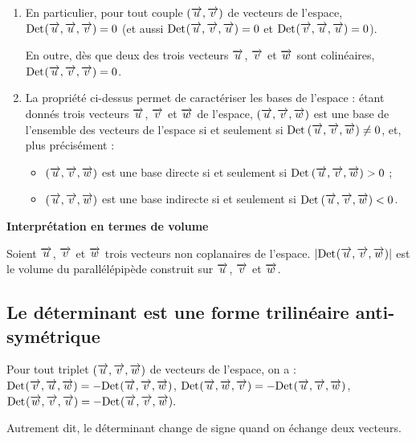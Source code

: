 \documentclass[10pt,oneside]{article}
\newcommand{\Det}{\mathrm{Det}\hspace{.2mm}}
\begin{document}
\begin{rem}

\begin{enumerate}
\item En particulier, pour tout couple $(\overrightarrow{u}, \overrightarrow{v})$ de vecteurs de l'espace, $\Det(\vect{u}, \vect{u}, \vect{v})=0$ (et aussi $\Det(\vect{u}, \vect{v}, \vect{u})=0$ et $\Det(\vect{v}, \vect{u}, \vect{u})=0$).

En outre, dès que deux des trois vecteurs $\overrightarrow{u}$, $\overrightarrow{v}$ et $\overrightarrow{w}$ sont colinéaires, $\Det(\vect{u},\vect{v}, \vect{v})=0$.
\item La propriété ci-dessus permet de caractériser les bases de l'espace : étant donnés trois vecteurs $\overrightarrow{u}$, $\overrightarrow{v}$ et $\overrightarrow{w}$ de l'espace, $(\overrightarrow{u}, \overrightarrow{v}, \overrightarrow{w})$ est une base de l'ensemble des vecteurs de l'espace si et seulement si $\Det\left(\vect{u}, \vect{v}, \vect{w}\right) \neq 0$, et, plus précisément :
	\begin{itemize}\renewcommand{\labelitemi}{$\bullet$}
	\item $(\overrightarrow{u}, \overrightarrow{v}, \overrightarrow{w})$ est une base directe si et seulement si $\Det\left(\vect{u}, \vect{v}, \vect{w}\right)>0$ ;
	\item $(\overrightarrow{u}, \overrightarrow{v}, \overrightarrow{w})$ est une base indirecte si et seulement si $\Det\left(\vect{u}, \vect{v}, \vect{w}\right)<0$.\\
	\end{itemize}
\end{enumerate}
\end{rem}

\begin{rem}
\textbf{Interprétation en termes de volume}

Soient $\overrightarrow{u}$, $\overrightarrow{v}$ et $\overrightarrow{w}$ trois vecteurs non coplanaires de l'espace.
$|\Det(\vect{u}, \vect{v}, \vect{w})|$ est le volume du parallélépipède construit sur $\overrightarrow{u}$, $\overrightarrow{v}$ et $\overrightarrow{w}$.\\

\end{rem}

\subsection{Le déterminant est une forme trilinéaire anti-symétrique}

\begin{propo}

Pour tout triplet $(\overrightarrow{u}, \overrightarrow{v}, \overrightarrow{w})$ de vecteurs de l'espace, on a :
$\Det(\vect{v},\vect{u}, \vect{w})=-\Det(\vect{u},\vect{v}, \vect{w})$, $\Det(\vect{u},\vect{w}, \vect{v})=-\Det(\vect{u},\vect{v}, \vect{w})$, $\Det(\vect{w},\vect{v}, \vect{u})=-\Det(\vect{u},\vect{v}, \vect{w}).$

Autrement dit, le déterminant change de signe quand on échange deux vecteurs.
\end{propo}
\end{document}
